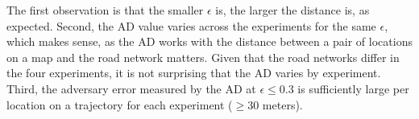 \documentclass[10pt,journal,compsoc]{IEEEtran}
\begin{document}
The first observation is that the smaller $\epsilon$ is, the larger the distance is, as expected. Second, the AD value varies across the experiments for the same $\epsilon$, which makes sense, as the AD works with the distance between a pair of locations on a map and the road network matters. Given that the road networks differ in the four experiments, it is not surprising that the AD varies by experiment. Third, the adversary error measured by the AD at $\epsilon\le0.3$ is sufficiently large per location on a trajectory for each experiment ($\ge30$ meters). 
\begin{table}[!htb]
\caption{Mean (SD) average distance between mapped locations on sanitized and original trajectories (100 repeats)}\label{tab:adversary} \vspace{-6pt}
\end{table}
\end{document}
